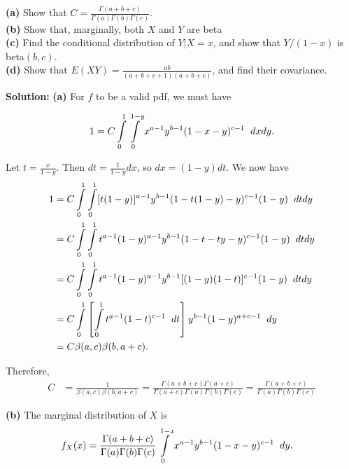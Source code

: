 \documentclass{article}
\newcommand{\mybox}{%
    \collectbox{%
        \setlength{\fboxsep}{1pt}%
        \fbox{\BOXCONTENT}%
    }%
}
\begin{document}
\noindent \textbf{(a)}  Show that $C = \frac{\Gamma(a+b+c)}{\Gamma(a)\Gamma(b)\Gamma(c)}$.  \\
\textbf{(b)}  Show that, marginally, both $X$ and $Y$ are beta \\
\textbf{(c)}  Find the conditional distribution of $Y|X=x$, and show that $Y/(1-x)$ is beta$(b,c)$.  \\
\textbf{(d)}  Show that $E(XY) = \frac{ab}{(a+b+c+1)(a+b+c)}$, and find their covariance.  

\vspace{3mm}

\noindent\mybox{\textbf{Solution:}}  \textbf{(a)}  For $f$ to be a valid pdf, we must have

\begin{align}
1 = C\int\limits_0^1\int\limits_0^{1-y}x^{a-1}y^{b-1}(1-x-y)^{c-1}\hspace{2mm}dxdy.
\end{align}

\noindent Let $t=\frac{x}{1-y}$.  Then $dt = \frac{1}{1-y}dx$, so $dx = (1-y)dt$.  We now have 
\begin{align}
1 &= C\int\limits_0^1\int\limits_0^1 [t(1-y)]^{a-1}y^{b-1}(1-t(1-y)-y)^{c-1}(1-y) \hspace{2mm} dtdy \\
&= C\int\limits_0^1\int\limits_0^1 t^{a-1}(1-y)^{a-1}y^{b-1}(1-t-ty-y)^{c-1}(1-y) \hspace{2mm} dtdy \\
&= C\int\limits_0^1\int\limits_0^1 t^{a-1}(1-y)^{a-1}y^{b-1}[(1-y)(1-t)]^{c-1}(1-y) \hspace{2mm} dtdy \\
&= C\int\limits_0^1\left[\int\limits_0^1t^{a-1}(1-t)^{c-1} \hspace{2mm} dt\right] y^{b-1}(1-y)^{a+c-1} \hspace{2mm} dy \\
&= C \beta(a,c) \beta(b, a+c).
\end{align}

\noindent Therefore, 
\begin{align}
C &= \frac{1}{\beta(a,c)\beta(b,a+c)} = \frac{\Gamma(a+b+c)\Gamma(a+c)}{\Gamma(a+c)\Gamma(a)\Gamma(b)\Gamma(c)} = \frac{\Gamma(a+b+c)}{\Gamma(a)\Gamma(b)\Gamma(c)}
\end{align}

\vspace{3mm}

\noindent\textbf{(b)}  The marginal distribution of $X$ is
\begin{align}
f_X(x) &= \frac{\Gamma(a+b+c)}{\Gamma(a)\Gamma(b)\Gamma(c)}\int\limits_0^{1-x}x^{a-1}y^{b-1}(1-x-y)^{c-1} \hspace{2mm} dy.
\end{align}
\end{document}
